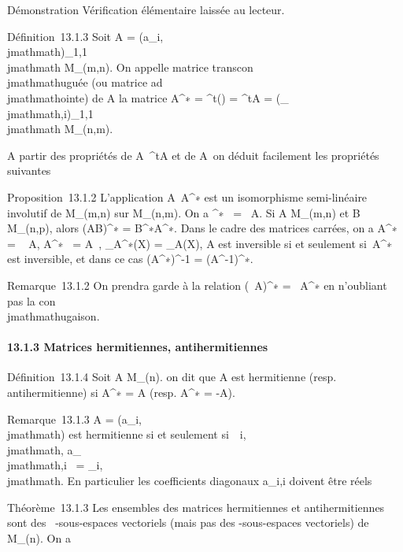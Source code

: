 \documentclass[]{article}
\begin{document}
Démonstration Vérification élémentaire laissée au lecteur.

Définition~13.1.3 Soit A = (a_i,\\jmathmath)_1\leqi\leqm,1\leq\\jmathmath\leqn \in
M_(m,n). On appelle matrice transcon\\jmathmathuguée (ou matrice
ad\\jmathmathointe) de A la matrice A^∗ =
^t(\overlineA) =
\overline^tA =
(\overlinea_\\jmathmath,i)_1\leqi\leqm,1\leq\\jmathmath\leqn \in
M_(n,m).

A partir des propriétés de A\mapsto~^tA
et de A\mapsto~\overlineA on
déduit facilement les propriétés suivantes

Proposition~13.1.2 L'application
A\mapsto~A^∗ est un isomorphisme
semi-linéaire involutif de M_(m,n) sur M_(n,m). On a
\mathrmrgA^∗~
= \mathrmrg~A. Si A \in
M_(m,n) et B \in M_(n,p), alors (AB)^∗ =
B^∗A^∗. Dans le cadre des matrices carrées, on a
 A^∗~ =
\overline{}~
A,
A^∗~ =
\overline{}A~,
\chi_A^∗(X) =
\overline\chi_A(X), A est inversible si et
seulement si~A^∗ est inversible, et dans ce cas
(A^∗)^-1 = (A^-1)^∗.

Remarque~13.1.2 On prendra garde à la relation (\lambda~A)^∗ =
\overline\lambda~A^∗ en n'oubliant pas la
con\\jmathmathugaison.

\paragraph{13.1.3 Matrices hermitiennes, antihermitiennes}

Définition~13.1.4 Soit A \in M_(n). on dit que A est hermitienne
(resp. antihermitienne) si A^∗ = A (resp. A^∗ =
-A).

Remarque~13.1.3 A = (a_i,\\jmathmath) est hermitienne si et seulement
si~\forall~i,\\jmathmath, a_\\jmathmath,i~ =
\overlinea_i,\\jmathmath. En particulier les
coefficients diagonaux a_i,i doivent être réels

Théorème~13.1.3 Les ensembles des matrices hermitiennes et
antihermitiennes sont des ~-sous-espaces vectoriels (mais pas des
-sous-espaces vectoriels) de M_(n). On a
\end{document}
